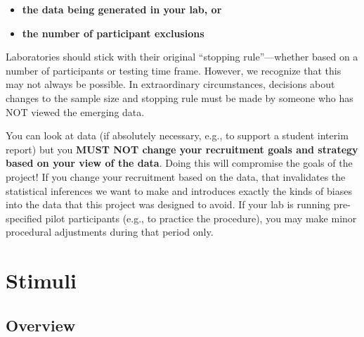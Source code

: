 \documentclass[
  letterpaper,
  DIV=11,
  numbers=noendperiod,
  oneside]{scrreprt}
\providecommand{\tightlist}{%
  \setlength{\itemsep}{0pt}\setlength{\parskip}{0pt}}
\begin{document}
\begin{tcolorbox}[enhanced jigsaw, coltitle=black, colframe=quarto-callout-important-color-frame, titlerule=0mm, colback=white, arc=.35mm, toprule=.15mm, left=2mm, colbacktitle=quarto-callout-important-color!10!white, opacityback=0, bottomtitle=1mm, title=\textcolor{quarto-callout-important-color}{\faExclamation}\hspace{0.5em}{It is critical for the integrity of the data analysis that you NOT make
any decisions about how many babies to test based on:}, breakable, rightrule=.15mm, opacitybacktitle=0.6, toptitle=1mm, leftrule=.75mm, bottomrule=.15mm]

\begin{itemize}
\tightlist
\item
  \textbf{the data being generated in your lab, or}
\item
  \textbf{the number of participant exclusions}
\end{itemize}

\end{tcolorbox}

Laboratories should stick with their original ``stopping
rule''---whether based on a number of participants or testing time
frame. However, we recognize that this may not always be possible. In
extraordinary circumstances, decisions about changes to the sample size
and stopping rule must be made by someone who has NOT viewed the
emerging data.

You can look at data (if absolutely necessary, e.g., to support a
student interim report) but you \textbf{MUST NOT change your recruitment
goals and strategy based on your view of the data}. Doing this will
compromise the goals of the project! If you change your recruitment
based on the data, that invalidates the statistical inferences we want
to make and introduces exactly the kinds of biases into the data that
this project was designed to avoid. If your lab is running pre-specified
pilot participants (e.g., to practice the procedure), you may make minor
procedural adjustments during that period only.

\chapter{Stimuli}\label{sec-stimuli}

\section{Overview}\label{overview-2}
\end{document}
